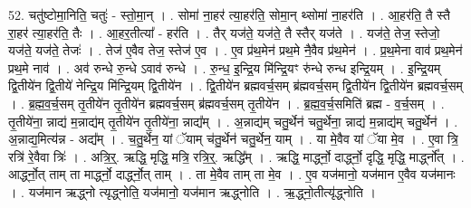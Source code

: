 \documentclass[17pt]{extarticle}
\begin{document}
52. चतु॑ष्टोमा॒निति॒ चतुः॑ - स्तो॒मा॒न् । . सोमा॑ ना॒हर॑ त्या॒हर॑ति॒ सोमा॒न् थ्सोमा॑ ना॒हर॑ति । . आ॒हर॑ति॒ तै स्तै रा॒हर॑ त्या॒हर॑ति॒ तैः । . आ॒हर॒तीत्या᳚ - हर॑ति । . तैर् यज॑ते॒ यज॑ते॒ तै स्तैर् यज॑ते । . यज॑ते॒ तेज॒ स्तेजो॒ यज॑ते॒ यज॑ते॒ तेजः॑ । . तेज॑ ए॒वैव तेज॒ स्तेज॑ ए॒व । . ए॒व प्र॑थ॒मेन॑ प्रथ॒मे नै॒वैव प्र॑थ॒मेन॑ । . प्र॒थ॒मेना वाव॑ प्रथ॒मेन॑ प्रथ॒मे नाव॑ । . अव॑ रुन्धे रु॒न्धे ऽवाव॑ रुन्धे । . रु॒न्ध॒ इ॒न्द्रि॒य मि॑न्द्रि॒यꣳ रु॑न्धे रुन्ध इन्द्रि॒यम् । . इ॒न्द्रि॒यम् द्वि॒तीये॑न द्वि॒तीये॑ नेन्द्रि॒य मि॑न्द्रि॒यम् द्वि॒तीये॑न । . द्वि॒तीये॑न ब्रह्मवर्च॒सम् ब्र॑ह्मवर्च॒सम् द्वि॒तीये॑न द्वि॒तीये॑न ब्रह्मवर्च॒सम् । . ब्र॒ह्म॒व॒र्च॒सम् तृ॒तीये॑न तृ॒तीये॑न ब्रह्मवर्च॒सम् ब्र॑ह्मवर्च॒सम् तृ॒तीये॑न । . ब्र॒ह्म॒व॒र्च॒समिति॑ ब्रह्म - व॒र्च॒सम् । . तृ॒तीये॑ना॒ न्नाद्य॑ म॒न्नाद्य॑म् तृ॒तीये॑न तृ॒तीये॑ना॒ न्नाद्य᳚म् । . अ॒न्नाद्य॑म् चतु॒र्थेन॑ चतु॒र्थेना॒ न्नाद्य॑ म॒न्नाद्य॑म् चतु॒र्थेन॑ । . अ॒न्नाद्य॒मित्य॑न्न - अद्य᳚म् । . च॒तु॒र्थेन॒ यां ॅयाम् च॑तु॒र्थेन॑ चतु॒र्थेन॒ याम् । . या मे॒वैव यां ॅया मे॒व । . ए॒वा त्रि॒ रत्रि॑ रे॒वैवा त्रिः॑ । . अत्रि॒र्॒. ऋद्धि॒ मृद्धि॒ मत्रि॒ रत्रि॒र्॒. ऋद्धि᳚म् । . ऋद्धि॒ मार्द्ध्नो॒ दार्द्ध्नो॒ दृद्धि॒ मृद्धि॒ मार्द्ध्नो᳚त् । . आर्द्ध्नो॒त् ताम् ता मार्द्ध्नो॒ दार्द्ध्नो॒त् ताम् । . ता मे॒वैव ताम् ता मे॒व । . ए॒व यज॑मानो॒ यज॑मान ए॒वैव यज॑मानः । . यज॑मान ऋद्ध्नो त्यृद्ध्नोति॒ यज॑मानो॒ यज॑मान ऋद्ध्नोति । . ऋ॒द्ध्नो॒तीत्यृ॑द्ध्नोति । \newline
\end{document}
